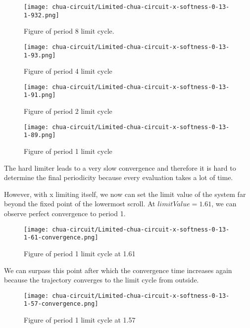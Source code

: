 \documentclass[main]{subfiles}
\begin{document}
\begin{figure}[H]
\centering
\texttt{[image: chua-circuit/Limited-chua-circuit-x-softness-0-13-1-932.png]}
\caption[Figure of period 8 limit cycle]{Figure of period 8 limit cycle.}
\label{figure:x-0.13-8-limit-cycle-trajectory}
\end{figure}

\begin{figure}[H]
\centering
\texttt{[image: chua-circuit/Limited-chua-circuit-x-softness-0-13-1-93.png]}
\caption[Figure of period 4 limit cycle]{Figure of period 4 limit cycle}
\label{figure:x-0.13-4-limit-cycle-trajectory}
\end{figure}

\begin{figure}[H]
\centering
\texttt{[image: chua-circuit/Limited-chua-circuit-x-softness-0-13-1-91.png]}
\caption[Figure of period 3 limit cycle]{Figure of period 2 limit cycle}
\label{figure:x-0.13-2-limit-cycle-trajectory}
\end{figure}

\begin{figure}[H]
\centering
\texttt{[image: chua-circuit/Limited-chua-circuit-x-softness-0-13-1-89.png]}
\caption[Figure of period 1 limit cycle]{Figure of period 1 limit cycle}
\label{figure:x-0.13-1-limit-cycle-trajectory}
\end{figure}

The hard limiter leads to a very slow convergence and therefore it is hard to determine the final periodicity because every evaluation takes a lot of time.

However, with x limiting itself, we now can set the limit value of the system far beyond the fixed point of the lowermost scroll. At \(limitValue=1.61\), we can observe perfect convergence to period 1.

\begin{figure}[H]
\centering
\texttt{[image: chua-circuit/Limited-chua-circuit-x-softness-0-13-1-61-convergence.png]}
\caption[Figure of period 1 limit cycle]{Figure of period 1 limit cycle at 1.61}
\label{figure:x-0.13-fast-1-limit-cycle-trajectory}
\end{figure}

We can surpass this point after which the convergence time increases again because the trajectory converges to the limit cycle from outside.

\begin{figure}[H]
\centering
\texttt{[image: chua-circuit/Limited-chua-circuit-x-softness-0-13-1-57-convergence.png]}
\caption[Figure of period 1 limit cycle]{Figure of period 1 limit cycle at 1.57}
\label{figure:x-0.13-fast-1-limit-cycle-trajectory}
\end{figure}
\end{document}
